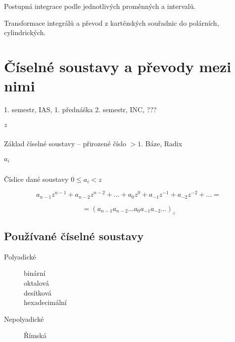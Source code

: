 \documentclass[a4paper, 11pt]{report}
\begin{document}
Postupná integrace podle jednotlivých proměnných a intervalů.

Transformace integrálů a převod z kartézských souřadnic do polárních, cylindrických.
































\chapter{Číselné soustavy a převody mezi nimi} \label{cha:18}

1. semestr, IAS, 1. přednáška
2. semestr, INC, ???

\paragraph{$z$} Základ číselné soustavy -- přirozené číslo $ > 1$. Báze, Radix

\paragraph{$a_i$} Číslice dané soustavy $ 0 \le a_i < z$

$$a_{n-1}z^{n-1} + a_{n-2} z^{n-2} + \dots + a_0 z^0 + a_{-1} z^{-1} + a_{-2} z^{-2} + \dots =$$

$$ = (a_{n-1} a_{n-2}  \dots a_0 a_{-1} a_{-2} \dots)_z$$

\section{Používané číselné soustavy}

\begin{description}
	\item[Polyadické] \hfill
	\begin{description}
		\item[binární]
		\item[oktalová]
		\item[desítková]
		\item[hexadecimální]
	\end{description}
	
	\item[Nepolyadické] \hfill
	\begin{description}
		\item[Římská]
	\end{description}	
\end{description}
\end{document}
